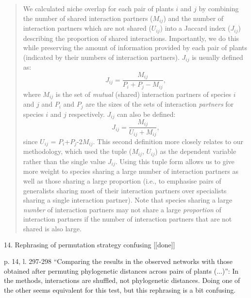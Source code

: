 \documentclass[12pt]{letter}
\newenvironment{refquote}{\bigskip \begin{it}}{\end{it}\smallskip}
\begin{document}
		\begin{quotation}
		    We calculated niche overlap for each pair of plants $i$ and $j$ by 
		    combining the number of shared interaction
		    partners ($M_{ij}$) and the number of interaction partners which are not
		    shared ($U_{ij}$) into a Jaccard index ($J_{ij}$) describing 
		    the proportion of shared interactions. Importantly, we do this while 
		    preserving the amount of information provided by each pair of plants
		    (indicated by their numbers of interaction partners). $J_{ij}$ is usually defined as: 
		    \begin{equation}
		      J_{ij} = \frac{M_{ij}}{P_i+P_j-M_{ij}} ,
		    \end{equation}
		    where $M_{ij}$ is the set of \emph{mutual} (shared) interaction partners of 
		    species $i$ and $j$ and $P_i$ and $P_j$ are the sizes of the sets of interaction 
		    \emph{partners} for species $i$ and $j$ respectively. $J_{ij}$ can also be defined:
		    \begin{equation}
		      J_{ij} = \frac{M_{ij}}{U_{ij}+M_{ij}} ,
		    \end{equation}
		    since $U_{ij}$ = $P_{i}$+$P_{j}$-2$M_{ij}$. This second definition more closely
		    relates to our methodology, which used the tuple ($M_{ij}$, $U_{ij}$) as the
		    dependent variable rather than the single value $J_{ij}$. Using this tuple form
		    allows us to give more 
		    weight to species sharing a large number of interaction partners as well as 
		    those sharing a large proportion (i.e., to emphasise pairs of generalists 
		    sharing most of their interaction partners over specialists sharing a single 
		    interaction partner). Note that species sharing a large \emph{number} of interaction partners may not share a large \emph{proportion} of interaction partners if the number of interaction partners that are not shared is also large. %
		    \end{quotation}


	14. Rephrasing of permutation strategy confusing [[done]]
		
		\begin{refquote}
			p. 14, l. 297-298 “Comparing the results in the observed networks with those obtained after permuting phylogenetic distances across pairs of plants (...)”: In the methods, interactions are shuffled, not phylogenetic distances. Doing one of the other seems equivalent for this test, but this rephrasing is a bit confusing.
		\end{refquote}
\end{document}
